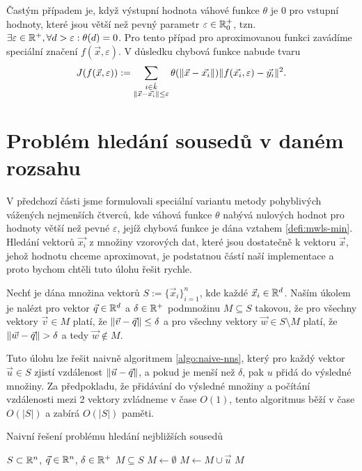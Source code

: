 Častým případem je, když výstupní hodnota váhové funkce $\theta$ je $0$ pro vstupní hodnoty, které jsou větší než pevný parametr $\varepsilon \in \mathbb{R}^+_0$, tzn. $\exists \varepsilon \in \mathbb{R}^+, \forall d > \varepsilon: \theta(d) = 0$. Pro tento případ pro aproximovanou funkci zavádíme speciální značení $f(\vec{x}, \varepsilon)$. V důsledku chybová funkce nabude tvaru
\newcommand{\mwlssum}{\sum_{\substack{i \in \hat k\\\norm{\vec{x}-\vec{x_i}} \leq \varepsilon}}}
\begin{equation}
  \label{defi:mwls-min}
  J(f(\vec{x},\varepsilon)) := \mwlssum \theta(\norm{\vec{x} - \vec{x_i}})\norm{f(\vec{x_i}, \varepsilon) - \vec{y_i}}^2.
\end{equation}

\section{Problém hledání sousedů v daném rozsahu}

V předchozí části jsme formulovali speciální variantu metody pohyblivých vážených nejmenších čtverců, kde váhová funkce $\theta$ nabývá nulových hodnot pro hodnoty větší než pevné $\varepsilon$, jejíž chybová funkce je dána vztahem \eqref{defi:mwls-min}. Hledání vektorů $\vec{x_i}$ z množiny vzorových dat, které jsou dostatečně  k vektoru $\vec{x}$, jehož hodnotu chceme aproximovat, je podstatnou částí naší implementace a proto bychom chtěli tuto úlohu řešit rychle.

Nechť je dána množina vektorů $S := \{\vec{x}_i\}_{i = 1}^n$, kde každé $\vec{x}_i \in \mathbb{R}^d$. Naším úkolem je nalézt pro vektor $\vec{q} \in \mathbb{R}^d$ a $\delta \in \mathbb{R}^+$ podmnožinu $M \subseteq S$ takovou, že pro všechny vektory $\vec{v} \in M$ platí, že $\|\vec{v} - \vec{q}\| \leq \delta$ a pro všechny vektory $\vec{w} \in S \setminus M$ platí, že $\|\vec{w} - \vec{q}\| > \delta$ a tedy $\vec{w} \not\in M$.

Tuto úlohu lze řešit naivně algoritmem \ref{algo:naive-nns}, který pro každý vektor $\vec{u} \in S$ zjistí vzdálenost $\|\vec{u} - \vec{q}\|$, a pokud je menší než $\delta$, pak $u$ přidá do výsledné množiny. Za předpokladu, že přidávání do výsledné množiny a počítání vzdálenosti mezi 2 vektory zvládneme v čase $O(1)$, tento algoritmus běží v čase $O(|S|)$ a zabírá $O(|S|)$ paměti.

\begin{algorithm}[ht!]
  \caption{Naivní řešení problému hledání nejbližších sousedů}
  \label{algo:naive-nns}
  \begin{algorithmic}
    \Require $S \subset \mathbb{R}^n$, $\vec{q} \in \mathbb{R}^n$, $\delta \in \mathbb{R}^+$
    \Ensure $M \subseteq S$
      \State $M \leftarrow \emptyset$
          \State $M \leftarrow M \cup \vec{u}$
        \EndIf
      \EndFor
    \State \Return $M$
    \EndProcedure
  \end{algorithmic}
\end{algorithm}

